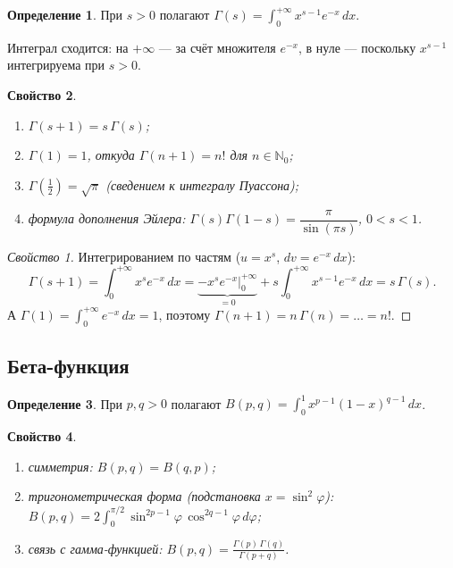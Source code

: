 \documentclass[11pt,a4paper]{article}
\theoremstyle{definition}
\newtheorem{definition}{Определение}[section]
\theoremstyle{plain}
\newtheorem{property}[definition]{Свойство}
\newcommand{\N}{\mathbb{N}}
\newcommand{\dx}{\,dx}
\begin{document}
\begin{definition}
При $s>0$ полагают $\displaystyle\Gamma(s)=\int_0^{+\infty}x^{s-1}e^{-x}\dx$.
\end{definition}

Интеграл сходится: на $+\infty$ — за счёт множителя $e^{-x}$, в нуле — поскольку $x^{s-1}$
интегрируема при $s>0$.

\begin{property}\leavevmode
\begin{enumerate}[label=\arabic*),leftmargin=*]
  \item $\Gamma(s+1)=s\,\Gamma(s)$;
  \item $\Gamma(1)=1$, откуда $\Gamma(n+1)=n!$ для $n\in\N_0$;
  \item $\Gamma\!\left(\tfrac12\right)=\sqrt\pi$ (сведением к интегралу Пуассона);
  \item формула дополнения Эйлера: $\Gamma(s)\Gamma(1-s)=\dfrac{\pi}{\sin(\pi s)}$, $0<s<1$.
\end{enumerate}
\end{property}

\begin{proof}[Свойство 1]
Интегрированием по частям ($u=x^s$, $dv=e^{-x}\dx$):
\[
  \Gamma(s+1)=\int_0^{+\infty}x^s e^{-x}\dx
   =\underbrace{-x^s e^{-x}\Big|_0^{+\infty}}_{=0}+s\int_0^{+\infty}x^{s-1}e^{-x}\dx=s\,\Gamma(s).
\]
А $\Gamma(1)=\int_0^{+\infty}e^{-x}\dx=1$, поэтому $\Gamma(n+1)=n\,\Gamma(n)=\dots=n!$.
\end{proof}

\subsection{Бета-функция}

\begin{definition}
При $p,q>0$ полагают $\displaystyle B(p,q)=\int_0^1 x^{p-1}(1-x)^{q-1}\dx$.
\end{definition}

\begin{property}\leavevmode
\begin{enumerate}[label=\arabic*),leftmargin=*]
  \item симметрия: $B(p,q)=B(q,p)$;
  \item тригонометрическая форма (подстановка $x=\sin^2\varphi$):
        $\displaystyle B(p,q)=2\int_0^{\pi/2}\sin^{2p-1}\varphi\,\cos^{2q-1}\varphi\,d\varphi$;
  \item связь с гамма-функцией: $\displaystyle B(p,q)=\frac{\Gamma(p)\,\Gamma(q)}{\Gamma(p+q)}$.
\end{enumerate}
\end{property}
\end{document}
